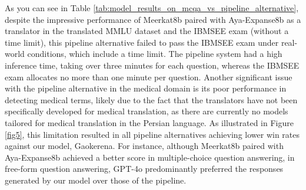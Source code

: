 \documentclass[conference]{IEEEtran}
\begin{document}
As you can see in Table
 \ref{tab:model_results_on_mcqa_vs_pipeline_alternative},
despite the impressive performance of Meerkat8b \cite{b5} paired with Aya-Expanse8b as a translator in the translated MMLU dataset and the IBMSEE exam (without a time limit), this pipeline alternative failed to pass the IBMSEE exam under real-world conditions, which include a time limit. The pipeline system had a high inference time, taking over three minutes for each question, whereas the IBMSEE exam allocates no more than one minute per question. Another significant issue with the pipeline alternative in the medical domain is its poor performance in detecting medical terms, likely due to the fact that the translators have not been specifically developed for medical translation, as there are currently no models tailored for medical translation in the Persian language. As illustrated in Figure \ref{fig5}, this limitation resulted in all pipeline alternatives achieving lower win rates against our model, Gaokerena. For instance, although Meerkat8b paired with Aya-Expanse8b achieved a better score in multiple-choice question answering, in free-form question answering, GPT-4o predominantly preferred the responses generated by our model over those of the pipeline.
\end{document}
